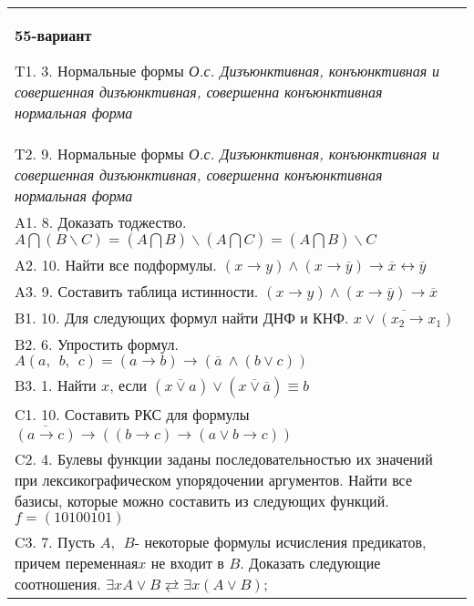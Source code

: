 \documentclass{article}
\begin{document}
\begin{tabular}{m{17cm}}
\textbf{55-вариант}
\newline

T1. 3. Нормальные формы \emph{О.с. Дизъюнктивная, конъюнктивная и совершенная дизъюнктивная, совершенна конъюнктивная нормальная форма} \\
T2. 9. Нормальные формы \emph{О.с. Дизъюнктивная, конъюнктивная и совершенная дизъюнктивная, совершенна конъюнктивная нормальная форма} \\
A1. 8. Доказать тоджество. \(A\bigcap(B\backslash C) = (A\bigcap B)\backslash(A\bigcap C) = (A\bigcap B)\backslash C\) \\
A2. 10. Найти все подформулы. \((x \rightarrow y) \land (x \rightarrow \overline{y}) \rightarrow \overline{x} \leftrightarrow \overline{y}\) \\
A3. 9. Составить таблица истинности. \((x \rightarrow y) \land (x \rightarrow \overline{y}) \rightarrow \overline{x}\) \\
B1. 10. Для следующих формул найти ДНФ и КНФ. \(\overline{x \vee (x_{2} \rightarrow x_{1})}\) \\
B2. 6. Упростить формул. \(A(a,\ \ b,\ \ c) = (a \rightarrow b) \rightarrow (\overline{a}\  \land (b \vee c))\) \\
B3. 1. Найти \(x\), если \(\left( \overline{x \vee a} \right) \vee \left( \overline{x \vee \overline{a}} \right) \equiv b\) \\
C1. 10. Составить РКС для формулы \(\overline{(a \rightarrow c)} \rightarrow \left( (b \rightarrow c) \rightarrow (a \vee b \rightarrow c) \right)\) \\
C2. 4. Булевы функции заданы последовательностью их значений при лексикографическом упорядочении аргументов. Найти все базисы, которые можно составить из следующих функций. \(f = (10100101)\) \\
C3. 7. Пусть \(A,\ \ B\)- некоторые формулы исчисления предикатов, причем переменная\(x\) не входит в \(B\). Доказать следующие соотношения. \(\exists xA \vee B \rightleftarrows \exists x(A \vee B)\); \\

\end{tabular}
\vspace{1cm}
\end{document}
